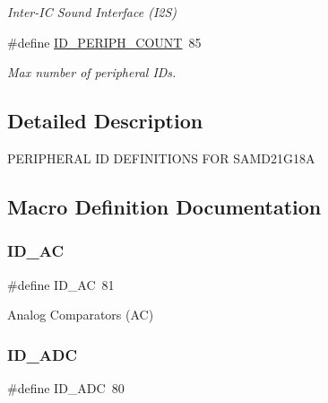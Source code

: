 \begin{DoxyCompactItemize}
\begin{DoxyCompactList}\small\item\em Inter-\/\+IC Sound Interface (I2S) \end{DoxyCompactList}\item 
\#define \mbox{\hyperlink{group___s_a_m_d21_g18_a__id_gad0762589e782b5eca161d9d344306da7}{I\+D\+\_\+\+P\+E\+R\+I\+P\+H\+\_\+\+C\+O\+U\+NT}}~85
\begin{DoxyCompactList}\small\item\em Max number of peripheral I\+Ds. \end{DoxyCompactList}\end{DoxyCompactItemize}


\subsection{Detailed Description}
P\+E\+R\+I\+P\+H\+E\+R\+AL ID D\+E\+F\+I\+N\+I\+T\+I\+O\+NS F\+OR S\+A\+M\+D21\+G18A 

\subsection{Macro Definition Documentation}
\mbox{\label{group___s_a_m_d21_g18_a__id_ga20fe08f8d0b2a4e6c0dbb2371aacadb0}} 
\subsubsection{\texorpdfstring{ID\_AC}{ID\_AC}}
{\footnotesize\ttfamily \#define I\+D\+\_\+\+AC~81}



Analog Comparators (AC) 

\mbox{\label{group___s_a_m_d21_g18_a__id_gafb7efa537d1d64419483b97f642009fd}} 
\subsubsection{\texorpdfstring{ID\_ADC}{ID\_ADC}}
{\footnotesize\ttfamily \#define I\+D\+\_\+\+A\+DC~80}



